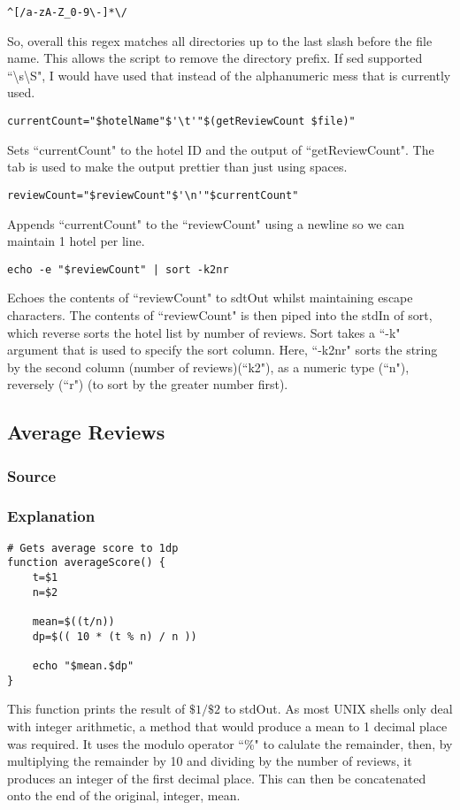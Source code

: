 \documentclass[a4paper]{article}
\begin{document}
\begin{lstlisting}
^[/a-zA-Z_0-9\-]*\/
\end{lstlisting}
So, overall this regex matches all directories up to the last slash before the file name.
This allows the script to remove the directory prefix.
If sed supported ``\textbackslash s\textbackslash S", I would have used that instead of the alphanumeric mess that is currently used.

\begin{lstlisting}
currentCount="$hotelName"$'\t'"$(getReviewCount $file)"
\end{lstlisting}
Sets ``currentCount" to the hotel ID and the output of ``getReviewCount".
The tab is used to make the output prettier than just using spaces.

\begin{lstlisting}
reviewCount="$reviewCount"$'\n'"$currentCount"
\end{lstlisting}
Appends ``currentCount" to the ``reviewCount" using a newline so we can maintain 1 hotel per line.

\begin{lstlisting}
echo -e "$reviewCount" | sort -k2nr
\end{lstlisting}
Echoes the contents of ``reviewCount" to sdtOut whilst maintaining escape characters.
The contents of ``reviewCount" is then piped into the stdIn of sort, which reverse sorts the hotel list by number of reviews.
Sort takes a ``-k" argument that is used to specify the sort column.
Here, ``-k2nr" sorts the string by the second column (number of reviews)(``k2"), as a numeric type (``n"), reversely (``r") (to sort by the greater number first).

%
\newpage
\subsection{Average Reviews}
\subsubsection{Source}


\newpage
\subsubsection{Explanation}
\begin{lstlisting}
# Gets average score to 1dp
function averageScore() {
	t=$1
	n=$2
	
	mean=$((t/n))
	dp=$(( 10 * (t % n) / n ))
	
	echo "$mean.$dp"
}
\end{lstlisting}
This function prints the result of $\$1 / \$2 $ to stdOut.
As most UNIX shells only deal with integer arithmetic, a method that would produce a mean to 1 decimal place was required.
It uses the modulo operator ``\%" to calulate the remainder, then, by multiplying the remainder by 10 and dividing by the number of reviews, it produces an integer of the first decimal place.
This can then be concatenated onto the end of the original, integer, mean.
\end{document}
